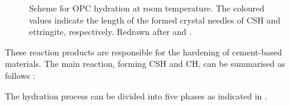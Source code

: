 \begin{figure}[!htb]
    \caption{
        Scheme for \ac{OPC} hydration at room temperature.
        The coloured values indicate the length of the formed crystal needles of {\color{red}\ac{CSH}} and {\color{green}ettringite}, respectively.
        Redrawn after \textcite{moser.2001} and \textcite{stark.2003}.
    }
    \label{fig:moeser_phase_dev}
\end{figure}

These reaction products are responsible for the hardening of cement-based materials.
The main reaction, forming \ac{CSH} and \ac{CH}, can be summarised as follows \cite{gartner.2002}:


The hydration process can be divided into five phases as indicated in .

